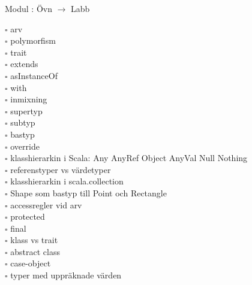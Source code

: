 
Modul : Övn  $\rightarrow$ Labb 
\begin{multicols}{3}\SlideFontTiny
$\square$ arv \\
$\square$ polymorfism \\
$\square$ trait \\
$\square$ extends \\
$\square$ asInstanceOf \\
$\square$ with \\
$\square$ inmixning \\
$\square$ supertyp \\
$\square$ subtyp \\
$\square$ bastyp \\
$\square$ override \\
$\square$ klasshierarkin i Scala: Any AnyRef Object AnyVal Null Nothing \\
$\square$ referenstyper vs värdetyper \\
$\square$ klasshierarkin i scala.collection \\
$\square$ Shape som bastyp till Point och Rectangle \\
$\square$ accessregler vid arv \\
$\square$ protected \\
$\square$ final \\
$\square$ klass vs trait \\
$\square$ abstract class \\
$\square$ case-object \\
$\square$ typer med uppräknade värden \\     
\end{multicols}
